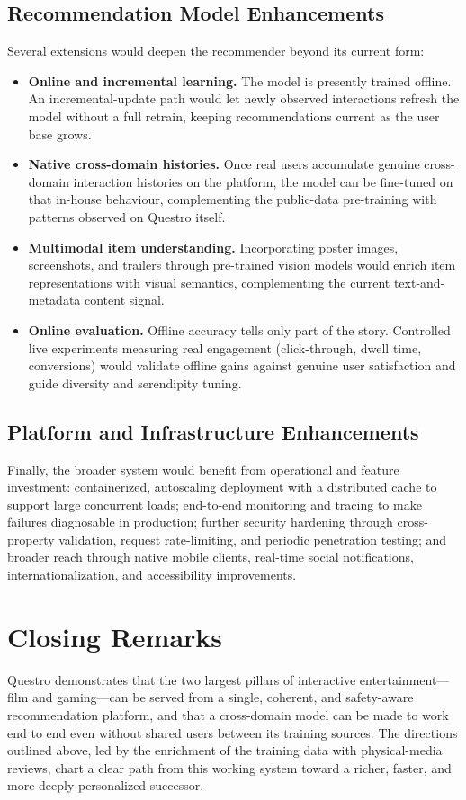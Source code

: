\subsection{Recommendation Model Enhancements}
Several extensions would deepen the recommender beyond its current form:
\begin{itemize}
    \item \textbf{Online and incremental learning.} The model is presently trained offline. An incremental-update path would let newly observed interactions refresh the model without a full retrain, keeping recommendations current as the user base grows.
    \item \textbf{Native cross-domain histories.} Once real users accumulate genuine cross-domain interaction histories on the platform, the model can be fine-tuned on that in-house behaviour, complementing the public-data pre-training with patterns observed on Questro itself.
    \item \textbf{Multimodal item understanding.} Incorporating poster images, screenshots, and trailers through pre-trained vision models would enrich item representations with visual semantics, complementing the current text-and-metadata content signal.
    \item \textbf{Online evaluation.} Offline accuracy tells only part of the story. Controlled live experiments measuring real engagement (click-through, dwell time, conversions) would validate offline gains against genuine user satisfaction and guide diversity and serendipity tuning.
\end{itemize}

\subsection{Platform and Infrastructure Enhancements}
Finally, the broader system would benefit from operational and feature investment: containerized, autoscaling deployment with a distributed cache to support large concurrent loads; end-to-end monitoring and tracing to make failures diagnosable in production; further security hardening through cross-property validation, request rate-limiting, and periodic penetration testing; and broader reach through native mobile clients, real-time social notifications, internationalization, and accessibility improvements.

\section{Closing Remarks}
Questro demonstrates that the two largest pillars of interactive entertainment---film and gaming---can be served from a single, coherent, and safety-aware recommendation platform, and that a cross-domain model can be made to work end to end even without shared users between its training sources. The directions outlined above, led by the enrichment of the training data with physical-media reviews, chart a clear path from this working system toward a richer, faster, and more deeply personalized successor.

